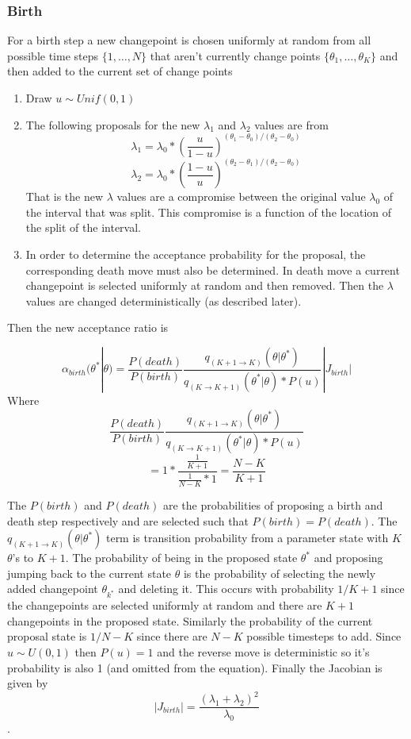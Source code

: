 \documentclass[]{article}
\numberwithin{equation}{section}
\begin{document}
\hypertarget{birth}{%
\subsubsection{Birth}\label{birth}}

For a birth step a new changepoint is chosen uniformly at random from
all possible time steps \(\{1,\dots,N\}\) that aren't currently change
points \(\{\theta_1,\dots,\theta_K\}\) and then added to the current set
of change points

\begin{enumerate}
\def\labelenumi{\arabic{enumi}.}
\item
  Draw \(u \sim Unif(0,1)\)
\item
  The following proposals for the new \(\lambda_1\) and \(\lambda_2\)
  values are from
  \[\lambda_1 = \lambda_0*(\frac{u}{1-u})^{(\theta_1-\theta_0)/(\theta_2-\theta_0)}\]
  \[\lambda_2 = \lambda_0*(\frac{1-u}{u})^{(\theta_2-\theta_1)/(\theta_2-\theta_0)}\]
  That is the new \(\lambda\) values are a compromise between the
  original value \(\lambda_0\) of the interval that was split. This
  compromise is a function of the location of the split of the interval.
\item
  In order to determine the acceptance probability for the proposal, the
  corresponding death move must also be determined. In death move a
  current changepoint is selected uniformly at random and then removed.
  Then the \(\lambda\) values are changed deterministically (as
  described later).
\end{enumerate}

Then the new acceptance ratio is

\[\alpha_{birth}(\theta^*|\theta) = \frac{P(death)}{P(birth)}\frac{q_{(K+1\rightarrow K)}(\theta|\theta^*)}{q_{(K\rightarrow K + 1)}(\theta^*|\theta)*P(u)}|J_{birth}|\]
Where
\[  \frac{P(death)}{P(birth)}\frac{q_{(K+1\rightarrow K)}(\theta|\theta^*)}{q_{(K\rightarrow K + 1)}(\theta^*|\theta)*P(u)} \]
\[= 1*\frac{\frac{1}{K+1}}{\frac{1}{N-K}*1} = \frac{N-K}{K+1} \]

The \(P(birth)\) and \(P(death)\) are the probabilities of proposing a
birth and death step respectively and are selected such that
\(P(birth) = P(death)\). The \(q_{(K+1\rightarrow K)}(\theta|\theta^*)\)
term is transition probability from a parameter state with \(K\)
\(\theta\)'s to \(K+1\). The probability of being in the proposed state
\(\theta^*\) and proposing jumping back to the current state \(\theta\)
is the probability of selecting the newly added changepoint
\(\theta_{k^*}\) and deleting it. This occurs with probability \(1/K+1\)
since the changepoints are selected uniformly at random and there are
\(K+1\) changepoints in the proposed state. Similarly the probability of
the current proposal state is \(1/N-K\) since there are \(N-K\) possible
timesteps to add. Since \(u \sim U(0,1)\) then \(P(u) = 1\) and the
reverse move is deterministic so it's probability is also 1 (and omitted
from the equation). Finally the Jacobian is given by
\[ |J_{birth}| = \frac{(\lambda_1 + \lambda_2)^2}{\lambda_0}\] .
\end{document}
